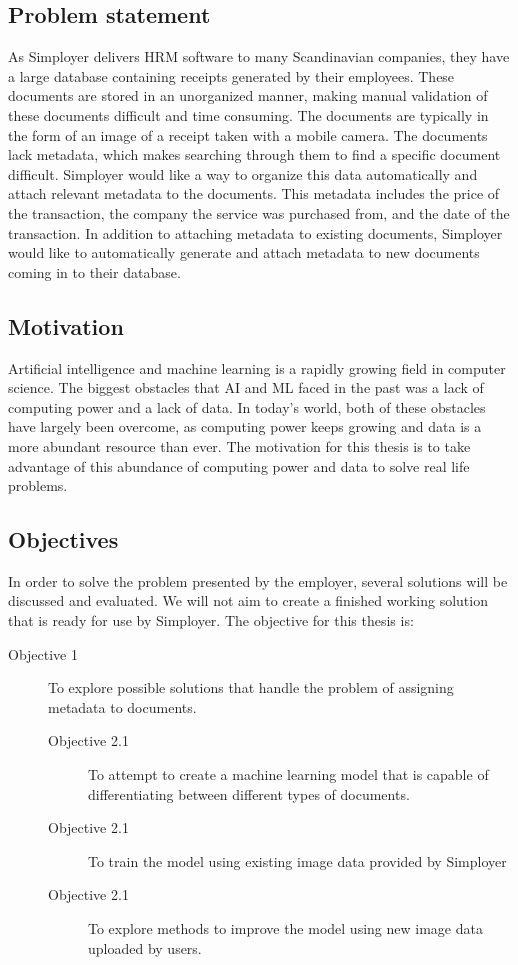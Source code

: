 \subsection{Problem statement}\label{subsec:problem-statement}
As Simployer delivers HRM software to many Scandinavian companies, they have a large database containing receipts generated by their employees.
These documents are stored in an unorganized manner, making manual validation of these documents difficult and time consuming.
The documents are typically in the form of an image of a receipt taken with a mobile camera.
The documents lack metadata, which makes searching through them to find a specific document difficult.
Simployer would like a way to organize this data automatically and attach relevant metadata to the documents.
This metadata includes the price of the transaction, the company the service was purchased from, and the date of the transaction.
In addition to attaching metadata to existing documents, Simployer would like to automatically generate and attach metadata to new documents coming in to their database.

\subsection{Motivation}\label{subsec:motivation}
Artificial intelligence and machine learning is a rapidly growing field in computer science.
The biggest obstacles that AI and ML faced in the past was a lack of computing power and a lack of data.
In today's world, both of these obstacles have largely been overcome, as computing power keeps growing and data is a more abundant resource than ever.
The motivation for this thesis is to take advantage of this abundance of computing power and data to solve real life problems.

\subsection{Objectives}\label{subsec:objectives}
In order to solve the problem presented by the employer, several solutions will be discussed and evaluated.
We will not aim to create a finished working solution that is ready for use by Simployer.
The objective for this thesis is:
\begin{description}
    \item[Objective 1] To explore possible solutions that handle the problem of assigning metadata to documents.
    \begin{description}
        \item[Objective 2.1] To attempt to create a machine learning model that is capable of differentiating between different types of documents.
        \item[Objective 2.1] To train the model using existing image data provided by Simployer
        \item[Objective 2.1] To explore methods to improve the model using new image data uploaded by users.
    \end{description}

\end{description}

